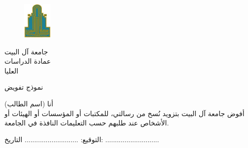 \documentclass[12pt,a4paper,oneside]{book} %
\theoremstyle{definition}
\newcommand{\size}[2]{{\fontsize{#1}{0}\selectfont#2}} %
\begin{document}
\thispagestyle{Form1}

	\begin{figure}[H]
	\hbox{\hspace{-1.45em}\includegraphics[width=0.56in,height=0.72in,right]{PNG/aabu}}
	\end{figure}
	\begin{flushleft}
	\begin{Arabic}
	\size{16}{جامعة آل البيت
	\\ عمادة الدراسات 
\\\hspace{1.6em}العليا}
	\end{Arabic}
	\end{flushleft}

	\begin{flushleft}
	\hspace{0.3in} 
	\begin{Arabic}
	\size{14}{نموذج تفويض} 
	\end{Arabic}
	\end{flushleft}

\vspace{0.3in}

\begin{center}
\begin{Arabic}
\size{14}{أنا (اسم الطالب)}
\vspace{0.3in}
\\ \size{14}{أفوض جامعة آل البيت بتزويد نُسخ من رسالتي، للمكتبات أو المؤسسات أو الهيئات أو الأشخاص عند طلبهم حسب التعليمات النافذة في الجامعة.}
\end{Arabic}
\end{center}

\vspace{1.3in}

\begin{Arabic}
\size{14}{التوقيع}: ............................ \hspace{1.4in} \size{14}{التاريخ}: ............................
\end{Arabic}


\clearpage


\thispagestyle{Form2}
\end{document}
